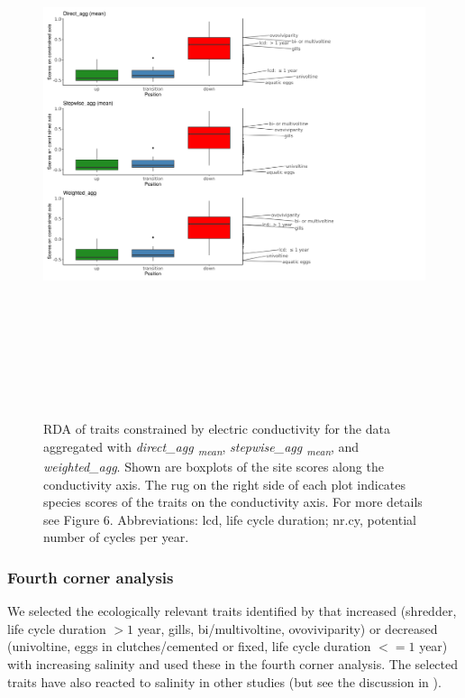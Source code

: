 \documentclass[12pt]{article}
\begin{document}
\begin{figure}[H]
    \centering
    \includegraphics[width=18.5cm, height=16cm]{boxplot_scores_combined_REMAIN_SI.png}
    \caption{RDA of traits constrained by electric conductivity for the data aggregated with \textit{direct\_agg \textsubscript{mean}}, \textit{stepwise\_agg \textsubscript{mean}}, and \textit{weighted\_agg}. Shown are boxplots of the site scores along the conductivity axis. The rug on the right side of each plot indicates species scores of the traits on the conductivity axis. For more details see Figure 6. %
    Abbreviations: lcd, life cycle duration; nr.cy, potential number of cycles per year.}
    \label{fig:boxplots_scores_on_constrained_axis_REMAIN}
\end{figure}

\subsubsection*{Fourth corner analysis}

We selected the ecologically relevant traits identified by \citet{szocs_effects_2014} that increased (shredder, life cycle duration $ > 1 $ year, gills, bi/multivoltine, ovoviviparity) or decreased (univoltine, eggs in clutches/cemented or fixed, life cycle duration $ <= 1$ year) with increasing salinity and used these in the fourth corner analysis. The selected traits have also reacted to salinity in other studies (but see the discussion in \citet{szocs_effects_2014}). 
\end{document}
